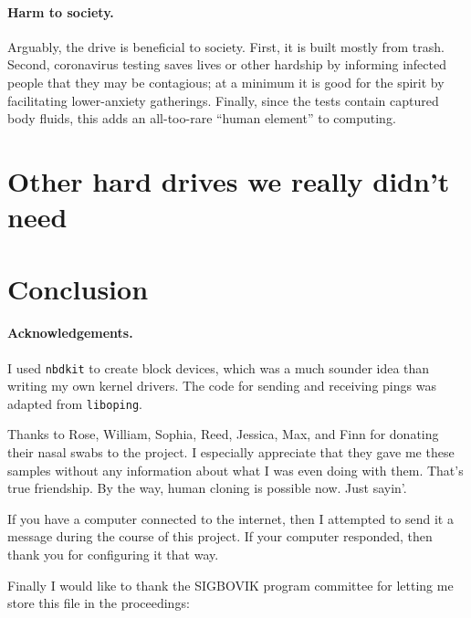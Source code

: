 \documentclass[twocolumn]{article}
\begin{document}
\paragraph{Harm to society.} Arguably, the drive is beneficial to
society. First, it is built mostly from trash. Second, coronavirus
testing saves lives or other hardship by informing infected people
that they may be contagious; at a minimum it is good for the spirit by
facilitating lower-anxiety gatherings. Finally, since the tests
contain captured body fluids, this adds an all-too-rare ``human
element'' to computing.


\section{Other hard drives we really didn't need}

\section{Conclusion}

\paragraph{Acknowledgements.}

I used {\tt nbdkit} to create block devices, which was a much sounder
idea than writing my own kernel drivers. The code for sending and
receiving pings was adapted from {\tt liboping}.

Thanks to Rose, William, Sophia, Reed, Jessica, Max, and Finn for
donating their nasal swabs to the project. I especially appreciate
that they gave me these samples without any information about what I
was even doing with them. That's true friendship. By the way, human
cloning is possible now. Just sayin'.

If you have a computer connected to the internet, then I attempted
to send it a message during the course of this project. If your
computer responded, then thank you for configuring it that way.

Finally I would like to thank the SIGBOVIK program committee for letting
me store this file in the proceedings:

%

\end{document}
